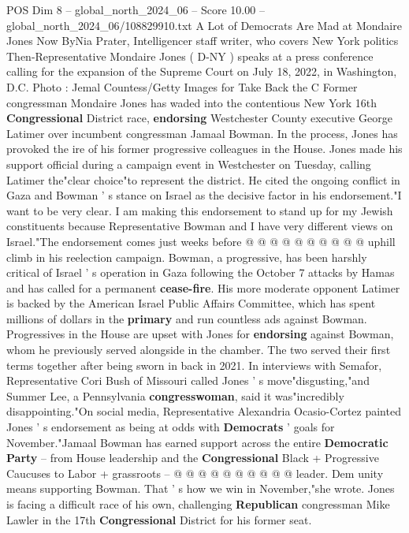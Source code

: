 \begin{textsample}{POS Dim 8 – global\_north\_2024\_06 – Score 10.00 – global\_north\_2024\_06/108829910.txt}  \label{ex:f8_pos_070}
A Lot of Democrats Are Mad at Mondaire Jones Now ByNia Prater, Intelligencer staff writer, who covers New York politics Then-Representative Mondaire Jones ( D-NY ) speaks at a press conference calling for the expansion of the Supreme Court on July 18, 2022, in Washington, D.C.
Photo : Jemal Countess/Getty Images for Take Back the C Former congressman Mondaire Jones has waded into the contentious New York 16th \textbf{Congressional} District race, \textbf{endorsing} Westchester County executive George Latimer over incumbent congressman Jamaal Bowman.
In the process, Jones has provoked the ire of his former progressive colleagues in the House.
Jones made his support official during a campaign event in Westchester on Tuesday, calling Latimer the"clear choice"to represent the district.
He cited the ongoing conflict in Gaza and Bowman ' s stance on Israel as the decisive factor in his endorsement."I want to be very clear.
I am making this endorsement to stand up for my Jewish constituents because Representative Bowman and I have very different views on Israel."The endorsement comes just weeks before @ @ @ @ @ @ @ @ @ @ uphill climb in his reelection campaign.
Bowman, a progressive, has been harshly critical of Israel ' s operation in Gaza following the October 7 attacks by Hamas and has called for a permanent \textbf{cease-fire}.
His more moderate opponent Latimer is backed by the American Israel Public Affairs Committee, which has spent millions of dollars in the \textbf{primary} and run countless ads against Bowman.
Progressives in the House are upset with Jones for \textbf{endorsing} against Bowman, whom he previously served alongside in the chamber.
The two served their first terms together after being sworn in back in 2021.
In interviews with Semafor, Representative Cori Bush of Missouri called Jones ' s move"disgusting,"and Summer Lee, a Pennsylvania \textbf{congresswoman}, said it was"incredibly disappointing."On social media, Representative Alexandria Ocasio-Cortez painted Jones ' s endorsement as being at odds with \textbf{Democrats} ' goals for November."Jamaal Bowman has earned support across the entire \textbf{Democratic} \textbf{Party} -- from House leadership and the \textbf{Congressional} Black + Progressive Caucuses to Labor + grassroots -- @ @ @ @ @ @ @ @ @ @ leader.
Dem unity means supporting Bowman.
That ' s how we win in November,"she wrote.
Jones is facing a difficult race of his own, challenging \textbf{Republican} congressman Mike Lawler in the 17th \textbf{Congressional} District for his former seat.

\end{textsample}
